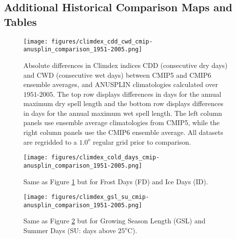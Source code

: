 \documentclass[]{scrartcl}
\begin{document}
\begin{appendices}
\clearpage

\section{Additional Historical Comparison Maps and Tables}\label{added_hist}

\begin{figure}[ht!]
	\centering
	\texttt{[image: figures/climdex\_cdd\_cwd\_cmip-anusplin\_comparison\_1951-2005.png]}
	\caption[DD]{Absolute differences in Climdex indices CDD (consecutive dry days) and CWD (consecutive wet days) between CMIP5 and CMIP6 ensemble averages, and ANUSPLIN climatologies calculated over $1951$-$2005$. The top row displays differences in days for the annual maximum dry spell length and the bottom row displays differences in days for the annual maximum wet spell length. The left column panels use ensemble average climatologies from CMIP5, while the right column panels use the CMIP6 ensemble average. All datasets are regridded to a $1.0^o$ regular grid prior to comparison.}
	\label{fig:ddETCCDI_hist}
\end{figure}

\begin{figure}[ht!]
	\centering
	\texttt{[image: figures/climdex\_cold\_days\_cmip-anusplin\_comparison\_1951-2005.png]}
	\caption[DD]{Same as Figure \ref{fig:ddETCCDI_hist} but for Frost Days (FD) and Ice Days (ID).}
	\label{fig:coldETCCDI_hist}
\end{figure}


\begin{figure}[ht!]
	\centering
	\texttt{[image: figures/climdex\_gsl\_su\_cmip-anusplin\_comparison\_1951-2005.png]}
	\caption[DD]{Same as Figure \ref{fig:coldETCCDI_hist} but for Growing Season Length (GSL) and Summer Days (SU: days above $25^o$C).}
	\label{fig:gslETCCDI_hist}
\end{figure}


\end{appendices}
\end{document}
